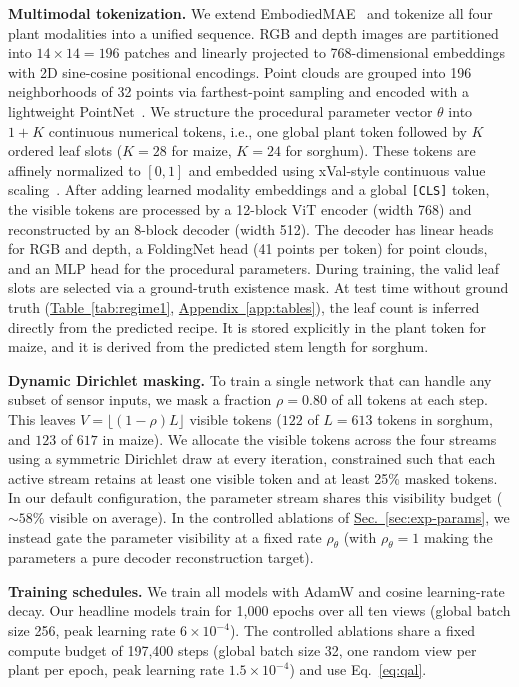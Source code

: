 \documentclass[10pt,twocolumn,letterpaper]{article}
\newcommand{\tabref}[1]{\hyperref[#1]{Table~\ref*{#1}}}
\newcommand{\secref}[1]{\hyperref[#1]{Sec.~\ref*{#1}}}
\newcommand{\appendixref}[1]{\hyperref[#1]{Appendix~\ref*{#1}}}
\begin{document}
\noindent\textbf{Multimodal tokenization.}
We extend EmbodiedMAE~\citep{dong2025embodiedmae} and tokenize all four plant modalities into a unified sequence. RGB and depth images are partitioned into $14 \times 14 = 196$ patches and linearly projected to 768-dimensional embeddings with 2D sine-cosine positional encodings. Point clouds are grouped into 196 neighborhoods of 32 points via farthest-point sampling and encoded with a lightweight PointNet~\citep{pang2022pointmae,qi2017pointnet}. We structure the procedural parameter vector $\theta$ into $1 + K$ continuous numerical tokens, i.e., one global plant token followed by $K$ ordered leaf slots ($K = 28$ for maize, $K = 24$ for sorghum). These tokens are affinely normalized to $[0,1]$ and embedded using xVal-style continuous value scaling~\citep{golkar2023xval}. After adding learned modality embeddings and a global \texttt{[CLS]} token, the visible tokens are processed by a 12-block ViT encoder (width 768) and reconstructed by an 8-block decoder (width 512). The decoder has linear heads for RGB and depth, a FoldingNet head (41 points per token) for point clouds, and an MLP head for the procedural parameters. During training, the valid leaf slots are selected via a ground-truth existence mask. At test time without ground truth (\tabref{tab:regime1}, \appendixref{app:tables}), the leaf count is inferred directly from the predicted recipe. It is stored explicitly in the plant token for maize, and it is derived from the predicted stem length for sorghum.

\noindent\textbf{Dynamic Dirichlet masking.}
To train a single network that can handle any subset of sensor inputs, we mask a fraction $\rho = 0.80$ of all tokens at each step. This leaves $V = \lfloor (1-\rho)L \rfloor$ visible tokens ($122$ of $L = 613$ tokens in sorghum, and $123$ of $617$ in maize). We allocate the visible tokens across the four streams using a symmetric Dirichlet draw at every iteration, constrained such that each active stream retains at least one visible token and at least 25\% masked tokens. In our default configuration, the parameter stream shares this visibility budget ($\sim 58\%$ visible on average). In the controlled ablations of \secref{sec:exp-params}, we instead gate the parameter visibility at a fixed rate $\rho_\theta$ (with $\rho_\theta = 1$ making the parameters a pure decoder reconstruction target).

\noindent\textbf{Training schedules.}
We train all models with AdamW and cosine learning-rate decay. Our headline models train for 1{,}000 epochs over all ten views (global batch size 256, peak learning rate $6 \times 10^{-4}$). The controlled ablations share a fixed compute budget of 197{,}400 steps (global batch size 32, one random view per plant per epoch, peak learning rate $1.5 \times 10^{-4}$) and use Eq.~\eqref{eq:qal}.
\end{document}
